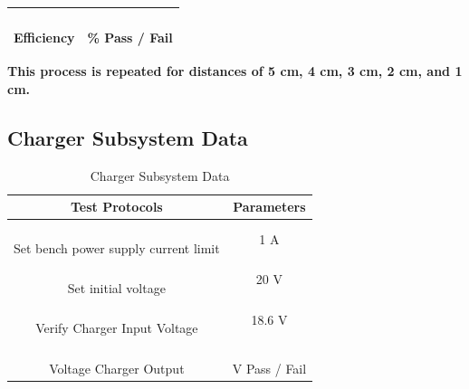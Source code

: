 \documentclass[12pt]{article}
\begin{document}
\begin{appendices}
\begin{table}[h!]
\begin{tabular}{ | c | c | }
\hline
\parbox{0.5\linewidth}{\raggedright \hfill \\[-0.25 em]
Efficiency
\hfill \\[0.1 em]} &  \parbox{0.4\linewidth}{\raggedright \hfill \\ [0.7 em]\underline{\hspace{0.625in}} 
\%
\hspace{0.125 in}Pass \space / \space  Fail \hfill \\ [0.3 em]} \\ 
\hline
\end{tabular}
\end{table}
\noindent
\textbf{This process is repeated for distances of 5 cm, 4 cm, 3 cm, 2 cm, and 1 cm.}

\subsection{Charger Subsystem Data}

\begin{table}[h!]
\centering
\caption*{Charger Subsystem Data}
\begin{tabular}{ | c | c | }
\hline
\textbf{Test Protocols} & \textbf{Parameters} \\
\hline
\parbox{0.5\linewidth}{\raggedright \hfill \\[-0.25 em]
Set bench power supply current limit
 \hfill \\[0.1 em]} & 
 1 A \\
\hline
\parbox{0.5\linewidth}{\raggedright \hfill \\[-0.25 em]
Set initial voltage
\hfill \\[0.1 em]} & 
20 V\\
\hline
\parbox{0.5\linewidth}{\raggedright \hfill \\[-0.25 em]
Verify Charger Input Voltage
\hfill \\[0.1 em]} &  
18.6 V\\
\hline
\parbox{0.5\linewidth}{\raggedright \hfill \\[-0.25 em]
Voltage Charger Output
\hfill \\[0.1 em]} &  \parbox{0.4\linewidth}{\raggedright \hfill \\ [0.7 em] \underline{\hspace{0.625in}} 
V 
\hspace{0.125 in}Pass \space / \space  Fail \hfill \\ [0.3 em]} \\ 
\hline
\end{tabular}
\end{table}
\hfill \\
\pagebreak


\end{appendices}
\end{document}
